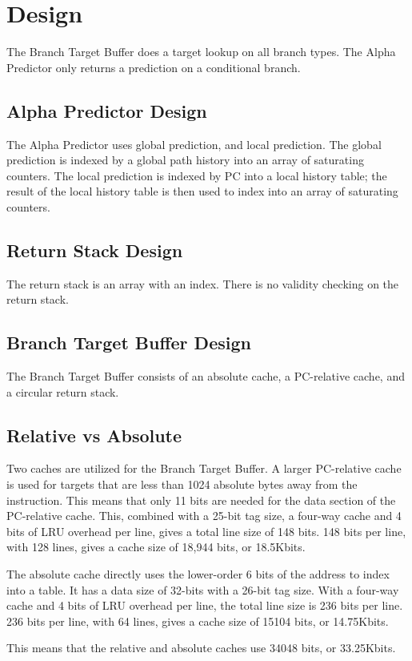 \section{Design}
The Branch Target Buffer does a target lookup on all branch types. The Alpha Predictor only returns a prediction on a conditional branch.

\subsection{Alpha Predictor Design}
The Alpha Predictor uses global prediction, and local prediction. The global prediction is indexed by a global path history into an array of saturating counters. The local prediction is indexed by PC into a local history table; the result of the local history table is then used to index into an array of saturating counters.

\subsection{Return Stack Design}
The return stack is an array with an index. There is no validity checking on the return stack. 

\subsection{Branch Target Buffer Design}
The Branch Target Buffer consists of an absolute cache, a PC-relative cache, and a circular return stack.

\subsection{Relative vs Absolute}
Two caches are utilized for the Branch Target Buffer. A larger PC-relative cache is used for targets that are less than 1024 absolute bytes away from the instruction. This means that only 11 bits are needed for the data section of the PC-relative cache. This, combined with a 25-bit tag size, a four-way cache and 4 bits of LRU overhead per line, gives a total line size of 148 bits. 148 bits per line, with 128 lines, gives a cache size of 18,944 bits, or 18.5Kbits.

The absolute cache directly uses the lower-order 6 bits of the address to index into a table. It has a data size of 32-bits with a 26-bit tag size. With a four-way cache and 4 bits of LRU overhead per line, the total line size is 236 bits per line. 236 bits per line, with 64 lines, gives a cache size of 15104 bits, or 14.75Kbits.

This means that the relative and absolute caches use 34048 bits, or 33.25Kbits. 
